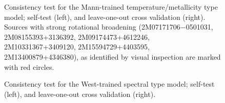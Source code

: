 \documentclass[modern]{aastex62}
\begin{document}
\color{gcolor}{HOGG: grants etc}\color{black} 

\color{gcolor}{ADAM: grants etc, FAST acknowledgement?}\color{black}


\newpage

\begin{figure}[ht]
\caption{Consistency test for the Mann-trained temperature/metallicity type model; self-test (left), and leave-one-out cross validation (right). Sources with strong rotational broadening (2M07171706−0501031, 2M08155393+3136392, 2M09174473+4612246, 2M10331367+3409120, 2M15594729+4403595, 2M13400879+4346380), as identified by visual inspection are marked with red circles.} \label{fig:mann_validation}
\end{figure}

\begin{figure}[ht]
\begin{center}
\end{center}
\caption{Consistency test for the West-trained spectral type model; self-test (left), and leave-one-out cross validation (right).} \label{fig:west_validation}
\end{figure}
\end{document}
